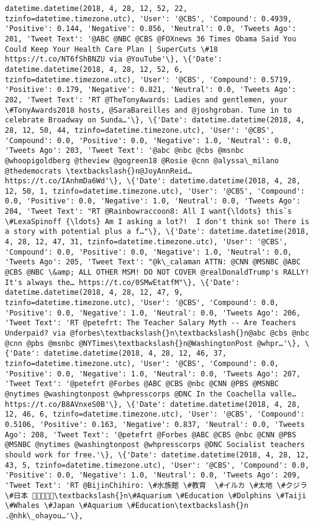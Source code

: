 \documentclass[11pt]{article}
\begin{document}
\begin{Verbatim}[commandchars=\\\{\}]
datetime.datetime(2018, 4, 28, 12, 52, 22, tzinfo=datetime.timezone.utc), 'User': '@CBS', 'Compound': 0.4939, 'Positive': 0.144, 'Negative': 0.856, 'Neutral': 0.0, 'Tweets Ago': 201, 'Tweet Text': '@ABC @NBC @CBS @FOXnews 36 Times Obama Said You Could Keep Your Health Care Plan | SuperCuts \#18 https://t.co/NT6fShBNZU via @YouTube'\}, \{'Date': datetime.datetime(2018, 4, 28, 12, 52, 6, tzinfo=datetime.timezone.utc), 'User': '@CBS', 'Compound': 0.5719, 'Positive': 0.179, 'Negative': 0.821, 'Neutral': 0.0, 'Tweets Ago': 202, 'Tweet Text': 'RT @TheTonyAwards: Ladies and gentlemen, your \#TonyAwards2018 hosts, @SaraBareilles and @joshgroban. Tune in to celebrate Broadway on Sunda…'\}, \{'Date': datetime.datetime(2018, 4, 28, 12, 50, 44, tzinfo=datetime.timezone.utc), 'User': '@CBS', 'Compound': 0.0, 'Positive': 0.0, 'Negative': 1.0, 'Neutral': 0.0, 'Tweets Ago': 203, 'Tweet Text': '@abc @nbc @cbs @msnbc @whoopigoldberg @theview @gogreen18 @Rosie @cnn @alyssa\_milano @thedemocrats \textbackslash{}n@JoyAnnReid… https://t.co/IAnhmDa6Wd'\}, \{'Date': datetime.datetime(2018, 4, 28, 12, 50, 1, tzinfo=datetime.timezone.utc), 'User': '@CBS', 'Compound': 0.0, 'Positive': 0.0, 'Negative': 1.0, 'Neutral': 0.0, 'Tweets Ago': 204, 'Tweet Text': "RT @Rainbowraccoon8: All I want{\ldots} this`s \#LexaSpinoff {\ldots} Am I asking a lot?!  I don't think so! There is a story with potential plus a f…"\}, \{'Date': datetime.datetime(2018, 4, 28, 12, 47, 31, tzinfo=datetime.timezone.utc), 'User': '@CBS', 'Compound': 0.0, 'Positive': 0.0, 'Negative': 1.0, 'Neutral': 0.0, 'Tweets Ago': 205, 'Tweet Text': "@k\_calaman ATTN: @CNN @MSNBC @ABC @CBS @NBC \&amp; ALL OTHER MSM! DO NOT COVER @realDonaldTrump's RALLY! It's always the… https://t.co/0SMwEtatfM"\}, \{'Date': datetime.datetime(2018, 4, 28, 12, 47, 9, tzinfo=datetime.timezone.utc), 'User': '@CBS', 'Compound': 0.0, 'Positive': 0.0, 'Negative': 1.0, 'Neutral': 0.0, 'Tweets Ago': 206, 'Tweet Text': 'RT @petefrt: The Teacher Salary Myth -- Are Teachers Underpaid? via @forbes\textbackslash{}n\textbackslash{}n@abc @cbs @nbc @cnn @pbs @msnbc @NYTimes\textbackslash{}n@WashingtonPost @whpr…'\}, \{'Date': datetime.datetime(2018, 4, 28, 12, 46, 37, tzinfo=datetime.timezone.utc), 'User': '@CBS', 'Compound': 0.0, 'Positive': 0.0, 'Negative': 1.0, 'Neutral': 0.0, 'Tweets Ago': 207, 'Tweet Text': '@petefrt @Forbes @ABC @CBS @nbc @CNN @PBS @MSNBC @nytimes @washingtonpost @whpresscorps @DNC In the Coachella valle… https://t.co/B8AVnxeS0B'\}, \{'Date': datetime.datetime(2018, 4, 28, 12, 46, 6, tzinfo=datetime.timezone.utc), 'User': '@CBS', 'Compound': 0.5106, 'Positive': 0.163, 'Negative': 0.837, 'Neutral': 0.0, 'Tweets Ago': 208, 'Tweet Text': '@petefrt @Forbes @ABC @CBS @nbc @CNN @PBS @MSNBC @nytimes @washingtonpost @whpresscorps @DNC Socialist teachers should work for free.'\}, \{'Date': datetime.datetime(2018, 4, 28, 12, 43, 5, tzinfo=datetime.timezone.utc), 'User': '@CBS', 'Compound': 0.0, 'Positive': 0.0, 'Negative': 1.0, 'Neutral': 0.0, 'Tweets Ago': 209, 'Tweet Text': 'RT @BijinChihiro: \#水族館 \#教育  \#イルカ \#太地 \#クジラ \#日本 🐋🐳🐬💔💔\textbackslash{}n\#Aquarium \#Education \#Dolphins \#Taiji \#Whales \#Japan \#Aquarium \#Education\textbackslash{}n .@nhk\_ohayou…'\}, 
\end{Verbatim}
\end{document}
